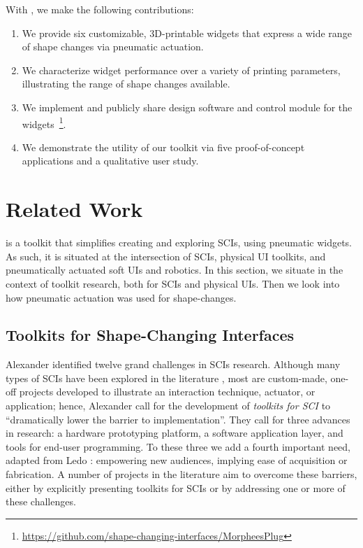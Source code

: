     With \mp, we make the following contributions:     
      \begin{enumerate}
        \item We provide six customizable, 3D-printable widgets that express
          a wide range of shape changes via pneumatic actuation.
        \item We characterize widget performance over a variety of printing
          parameters, illustrating the range of shape changes available.
        \item We implement and publicly share design software and control
          module for the
          widgets~\footnote{\url{https://github.com/shape-changing-interfaces/MorpheesPlug}}.
        \item We demonstrate the utility of our toolkit via five
          proof-of-concept applications and a qualitative user study.
      \end{enumerate}

  \section{Related Work}
    \mp is a toolkit that simplifies creating and exploring SCIs, using
    pneumatic widgets. As such, it is situated at the intersection of
    SCIs, physical UI toolkits, and pneumatically actuated soft UIs and
    robotics. In this section, we situate \mp in the context of toolkit
    research, both for SCIs and physical UIs. Then we look into how
    pneumatic actuation was used for shape-changes.
    
    \subsection{Toolkits for Shape-Changing Interfaces}
      Alexander \etal \cite{10.1145/3173574.3173873} identified twelve grand
      challenges in SCIs research. Although many types of SCIs have been
      explored in the literature \cite{Sturdee:2018ce}, most are custom-made,
      one-off projects developed to illustrate an interaction technique,
      actuator, or application; hence, Alexander \etal
      \cite{10.1145/3173574.3173873} call for the development of
      \textit{toolkits for SCI} to ``dramatically lower the barrier to
      implementation''. They call for three advances in research: a hardware
      prototyping platform, a software application layer, and tools for end-user
      programming. To these three we add a fourth important need, adapted from
      Ledo \etal \cite{10.1145/3173574.3173610}: empowering new audiences,
      implying ease of acquisition or fabrication. A number of projects in the
      literature aim to overcome these barriers, either by explicitly presenting
      toolkits for SCIs or by addressing one or more of these challenges.
      
